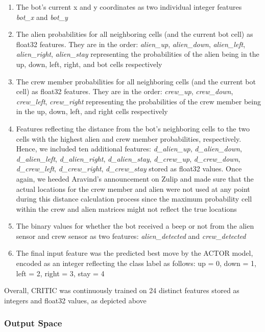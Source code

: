\documentclass[11pt]{article}
\begin{document}
\begin{enumerate}
    \item The bot's current x and y coordinates as two individual integer features \emph{bot\_x} and \emph{bot\_y}
    \item The alien probabilities for all neighboring cells (and the current bot cell) as float32 features. They are in the order: \emph{alien\_up}, \emph{alien\_down}, \emph{alien\_left}, \emph{alien\_right}, \emph{alien\_stay} representing the probabilities of the alien being in the up, down, left, right, and bot cells respectively
    \item The crew member probabilities for all neighboring cells (and the current bot cell) as float32 features. They are in the order: \emph{crew\_up}, \emph{crew\_down}, \emph{crew\_left}, \emph{crew\_right} representing the probabilities of the crew member being in the up, down, left, and right cells respectively
    \item Features reflecting the distance from the bot's neighboring cells to the two cells with the highest alien and crew member probabilities, respectively. Hence, we included ten additional features: \emph{d\_alien\_up}, \emph{d\_alien\_down}, \emph{d\_alien\_left}, \emph{d\_alien\_right}, \emph{d\_alien\_stay}, \emph{d\_crew\_up}, \emph{d\_crew\_down}, \emph{d\_crew\_left}, \emph{d\_crew\_right}, \emph{d\_crew\_stay} stored as float32 values. Once again, we heeded Aravind's announcement on Zulip and made sure that the actual locations for the crew member and alien were not used at any point during this distance calculation process since the maximum probability cell within the crew and alien matrices might not reflect the true locations
    \item The binary values for whether the bot received a beep or not from the alien sensor and crew sensor as two features: \emph{alien\_detected} and \emph{crew\_detected}
    \item The final input feature was the predicted best move by the ACTOR model, encoded as an integer reflecting the class label as follows: up = 0, down = 1, left = 2, right = 3, stay = 4
\end{enumerate}

Overall, CRITIC was continuously trained on 24 distinct features stored as integers and float32 values, as depicted above

\subsubsection{Output Space}
\end{document}
